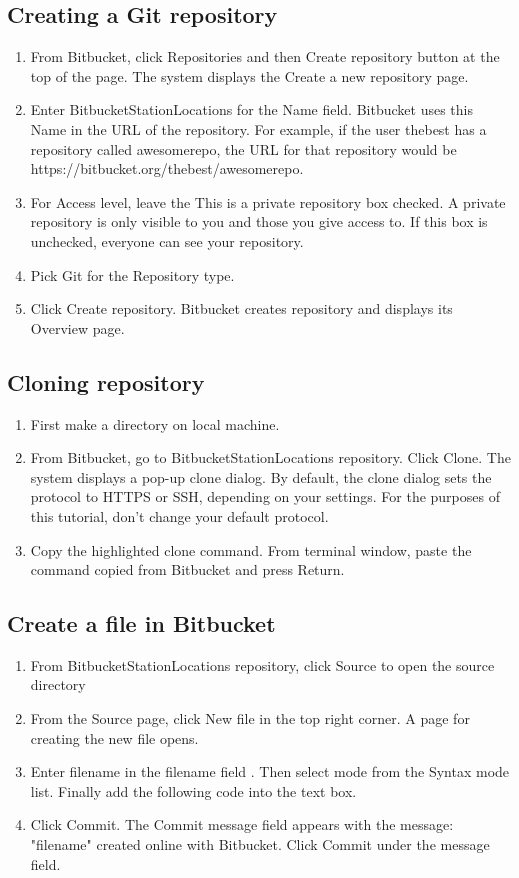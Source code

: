 \documentclass{article}
\begin{document}
\subsection{Creating a Git repository}
    \begin{enumerate}
        \item From Bitbucket, click Repositories and then Create repository button at the top of the page.
         The system displays the Create a new repository page.
        \item Enter BitbucketStationLocations for the Name field.
    Bitbucket uses this Name in the URL of the repository. For example, if the user thebest has a repository called awesomerepo, the URL for that repository would be https://bitbucket.org/thebest/awesomerepo.
        \item For Access level, leave the This is a private repository box checked. A private repository is only visible to you and those you give access to. If this box is unchecked, everyone can see your repository.
        \item Pick Git for the Repository type. 
        \item Click Create repository. Bitbucket creates repository and displays its Overview page.
    \end{enumerate}

\subsection{Cloning repository}
    \begin{enumerate}
        \item First make a directory on local machine.
        \item From Bitbucket, go to BitbucketStationLocations repository.
        Click Clone. The system displays a pop-up clone dialog. By default, the clone dialog sets the protocol to HTTPS or SSH, depending on your settings. For the purposes of this tutorial, don't change your default protocol.
        \item Copy the highlighted clone command. From terminal window, paste the command copied from Bitbucket and press Return.
    \end{enumerate}

\subsection {Create a file in Bitbucket}
    \begin{enumerate}
        \item From BitbucketStationLocations repository, click Source to open the source directory
        \item From the Source page, click New file in the top right corner.
    A page for creating the new file opens. 
        \item Enter filename in the  filename  field . Then select mode from the Syntax mode list. Finally add the following  code into the text box.
        \item Click Commit. The Commit message field appears with the message: "filename" created online with Bitbucket. Click Commit under the message field.
    \end{enumerate}
\end{document}
